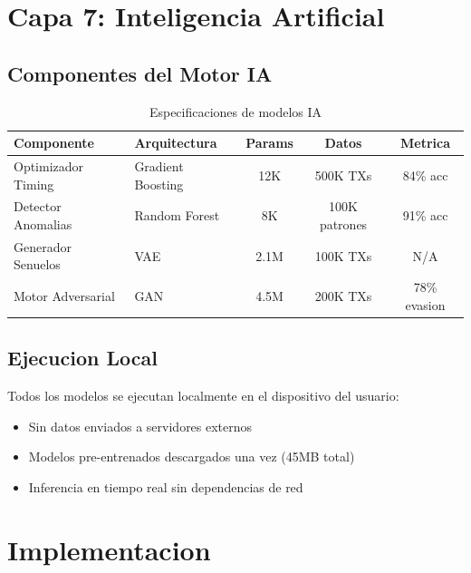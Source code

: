 \documentclass[11pt]{article}
\theoremstyle{definition}
\theoremstyle{plain}
\theoremstyle{remark}
\begin{document}
\section{Capa 7: Inteligencia Artificial}
\label{sec:layer7}

\subsection{Componentes del Motor IA}

\begin{table}[H]
\centering
\caption{Especificaciones de modelos IA}
\label{tab:ai_models}
\begin{tabular}{llccc}
\toprule
\textbf{Componente} & \textbf{Arquitectura} & \textbf{Params} & \textbf{Datos} & \textbf{Metrica} \\
\midrule
Optimizador Timing & Gradient Boosting & 12K & 500K TXs & 84\% acc \\
Detector Anomalias & Random Forest & 8K & 100K patrones & 91\% acc \\
Generador Senuelos & VAE & 2.1M & 100K TXs & N/A \\
Motor Adversarial & GAN & 4.5M & 200K TXs & 78\% evasion \\
\bottomrule
\end{tabular}
\end{table}

\subsection{Ejecucion Local}

Todos los modelos se ejecutan localmente en el dispositivo del usuario:
\begin{itemize}
    \item Sin datos enviados a servidores externos
    \item Modelos pre-entrenados descargados una vez (45MB total)
    \item Inferencia en tiempo real sin dependencias de red
\end{itemize}

\section{Implementacion}
\label{sec:implementation}
\end{document}
